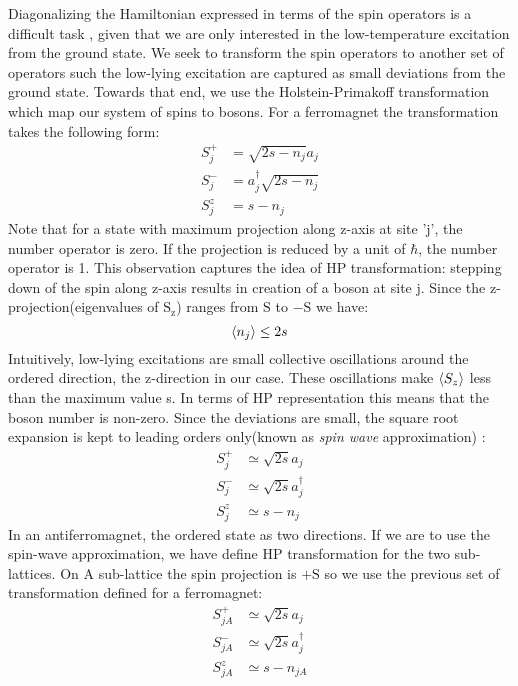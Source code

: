 Diagonalizing the Hamiltonian expressed in terms of the spin operators is a difficult task , given that we are only interested in the low-temperature excitation from the ground state. We seek to transform the spin operators to another set of operators such the low-lying excitation are captured as small deviations from the ground state. Towards that end, we use the Holstein-Primakoff transformation which map our system of spins to bosons. For a ferromagnet the transformation takes the following form:
\begin{equation}
\begin{split}
S^+_j &= \sqrt{2s - n_j}a_j\\
S^-_j &= a^\dagger_j\sqrt{2s - n_j}\\
S^z_j &= s - n_j
\end{split}
\end{equation}
Note that for a state with maximum projection along z-axis at site 'j', the number operator is zero. If the projection is reduced by a unit of $ \hbar $, the number operator is 1. This observation captures the idea of HP transformation: stepping down of the spin along z-axis results in creation of a boson at site j. Since the z-projection(eigenvalues of $ \mathrm{S_z} $) ranges from $\mathrm{S}$ to $\mathrm{-S}$ we have:
\begin{equation}
\expval{n_j} \leq 2s
\end{equation}
Intuitively, low-lying excitations are small collective oscillations around the ordered direction, the z-direction in our case. These oscillations make $ \expval{S_z} $ less than the maximum value s. In terms of HP representation this means that the boson number is non-zero. Since the deviations are small, the square root expansion is kept to leading orders only(known as \textit{spin wave} approximation) :
\begin{equation}
\begin{split}
S^+_j &\simeq \sqrt{2s}a_j\\
S^-_j &\simeq \sqrt{2s}a^\dagger_j\\
S^z_j &\simeq s - n_j
\end{split}
\end{equation}
In an antiferromagnet, the ordered state as two directions. If we are to use the spin-wave approximation, we have define HP transformation for the two sub-lattices. On A sub-lattice the spin projection is $ \mathrm{+S} $ so we use the previous set of transformation defined for a ferromagnet:
\begin{equation}\label{eq27}
\begin{split}
S^+_{jA} &\simeq \sqrt{2s}a_j\\
S^-_{jA} &\simeq \sqrt{2s}a^\dagger_j\\
S^z_{jA} &\simeq s - n_{jA}
\end{split}
\end{equation}

